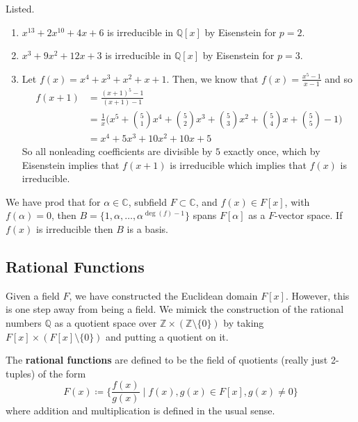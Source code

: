   \begin{example}
    Listed. 
    \begin{enumerate}
      \item $x^{13} + 2x^{10} + 4x + 6$ is irreducible in $\mathbb{Q}[x]$ by Eisenstein for $p = 2$. 
      \item $x^3 + 9x^2 + 12x + 3$ is irreducible in $\mathbb{Q}[x]$ by Eisenstein for $p = 3$. 
      \item Let $f(x) = x^4 + x^3 + x^2 + x + 1$. Then, we know that $f(x) = \frac{x^5 - 1}{x-1}$ and so 
      \begin{align}
        f(x + 1) & = \frac{(x + 1)^5 - 1}{(x + 1) - 1} \\
                 & = \frac{1}{x} \bigg( x^5 + \binom{5}{1} x^4 + \binom{5}{2} x^3 + \binom{5}{3} x^2 + \binom{5}{4} x + \binom{5}{5} - 1 \bigg) \\
                 & = x^4 + 5x^3 + 10 x^2 + 10x + 5
      \end{align}
      So all nonleading coefficients are divisible by $5$ exactly once, which by Eisenstein implies that $f(x+1)$ is irreducible which implies that $f(x)$ is irreducible. 
    \end{enumerate}
  \end{example}

  We have prod that for $\alpha \in \mathbb{C}$, subfield $F \subset \mathbb{C}$, and $f(x) \in F[x]$, with $f(\alpha) = 0$, then $B = \{1, \alpha, \ldots, \alpha^{\deg(f) - 1}\}$ spans $F[\alpha]$ as a $F$-vector space. If $f(x)$ is irreducible then $B$ is a basis. 

\subsection{Rational Functions}

  Given a field $F$, we have constructed the Euclidean domain $F[x]$. However, this is one step away from being a field. We mimick the construction of the rational numbers $\mathbb{Q}$ as a quotient space over $\mathbb{Z} \times (\mathbb{Z} \setminus \{0\})$ by taking $F[x] \times (F[x] \setminus \{0\})$ and putting a quotient on it. 
  
  \begin{definition}
    The \textbf{rational functions} are defined to be the field of quotients (really just 2-tuples) of the form 
    \begin{equation}
      F(x) \coloneqq \bigg\{ \frac{f(x)}{g(x)} \; \bigg| \; f(x), g(x) \in F[x], g(x) \neq 0 \bigg\}
    \end{equation}
    where addition and multiplication is defined in the usual sense.
  \end{definition}

